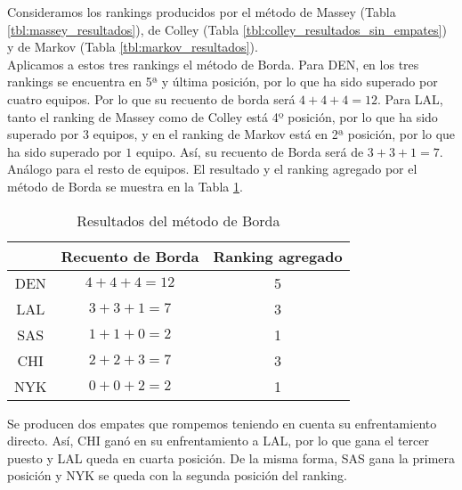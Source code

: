 \begin{ejemplo}\label{ej:borda}
Consideramos los rankings producidos por el método de Massey (Tabla \ref{tbl:massey_resultados}), de Colley (Tabla \ref{tbl:colley_resultados_sin_empates}) y de Markov (Tabla \ref{tbl:markov_resultados}).\\

Aplicamos a estos tres rankings el método de Borda. Para DEN, en los tres rankings se encuentra en 5ª y última posición, por lo que ha sido superado por cuatro equipos. Por lo que su recuento de borda será $4 + 4 + 4 = 12$. Para LAL, tanto el ranking de Massey como de Colley está 4º posición, por lo que ha sido superado por $3$ equipos, y en el ranking de Markov está en 2ª posición, por lo que ha sido superado por $1$ equipo. Así, su recuento de Borda será de $3 + 3 + 1 = 7$. Análogo para el resto de equipos. El resultado y el ranking agregado por el método de Borda se muestra en la Tabla \ref{tbl:borda_resultados}.

\begin{table}[h]
\centering
\caption{Resultados del método de Borda}
\label{tbl:borda_resultados}
\begin{tabular}{@{}ccc@{}}
\cmidrule(l){2-3}
    & Recuento de Borda & Ranking agregado \\ \midrule
DEN & $4 + 4 + 4 = 12$       & 5       \\
LAL & $3 + 3 + 1 =  7$       & 3       \\
SAS & $1 + 1 + 0 =  2$       & 1       \\
CHI & $2 + 2 + 3 =  7$       & 3       \\
NYK & $0 + 0 + 2 =  2$       & 1       \\ \bottomrule
\end{tabular}
\end{table}

Se producen dos empates que rompemos teniendo en cuenta su enfrentamiento directo. Así, CHI ganó en su enfrentamiento a LAL, por lo que gana el tercer puesto y LAL queda en cuarta posición. De la misma forma, SAS gana la primera posición y NYK se queda con la segunda posición del ranking. 

\end{ejemplo}


